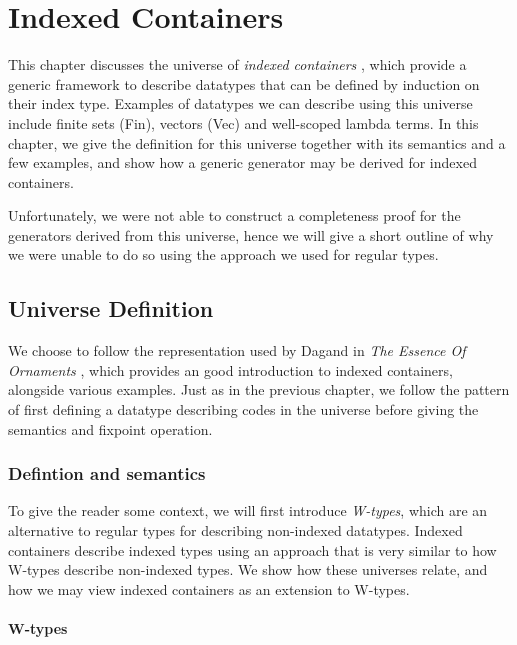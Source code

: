\documentclass[a4paper,msc,twosized=semi]{uustthesis}
\let\oldemph\emph
\renewcommand\emph[1]{{\large\oldemph{#1}}}
\newcommand{\agda}[1]{{\agdafontinline\color{agdacolor}#1}}
\begin{document}
\chapter{Indexed Containers}
  This chapter discusses the universe of \emph{indexed containers} \cite
  {altenkirch2015indexed}, which provide a generic framework to describe datatypes 
  that can be defined by induction on their index type. Examples of datatypes we can 
  describe using this universe include finite sets (\agda{Fin}), vectors (\agda{Vec}) and 
  well-scoped lambda terms. In this chapter, we give the definition for this universe 
  together with its semantics and a few examples, and show how a generic generator may 
  be derived for indexed containers. 

  Unfortunately, we were not able to construct a completeness proof for the generators 
  derived from this universe, hence we will give a short outline of why we were unable 
  to do so using the approach we used for regular types. 

\section{Universe Definition}

  We choose to follow the representation used by Dagand in \emph{The Essence Of 
  Ornaments} \cite{dagand2017essence}, which provides an good introduction to indexed 
  containers, alongside various examples. Just as in the previous chapter, we follow 
  the pattern of first defining a datatype describing codes in the universe before 
  giving the semantics and fixpoint operation. 

\subsection{Defintion and semantics}

  To give the reader some context, we will first introduce \emph{W-types}, which are 
  an alternative to regular types for describing non-indexed datatypes. Indexed 
  containers describe indexed types using an approach that is very similar to how 
  W-types describe non-indexed types. We show how these universes relate, and how we 
  may view indexed containers as an extension to W-types. 

\subsubsection{W-types} 
  
\end{document}

